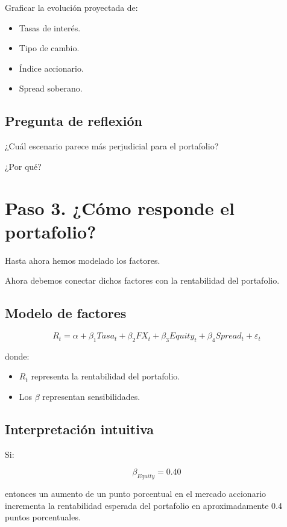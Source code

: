 \documentclass[11pt]{article}
\begin{document}
Graficar la evolución proyectada de:

\begin{itemize}
\item Tasas de interés.
\item Tipo de cambio.
\item Índice accionario.
\item Spread soberano.
\end{itemize}

\subsection*{Pregunta de reflexión}

¿Cuál escenario parece más perjudicial para el portafolio?

¿Por qué?

\section{Paso 3. ¿Cómo responde el portafolio?}

Hasta ahora hemos modelado los factores.

Ahora debemos conectar dichos factores con la rentabilidad del portafolio.

\subsection*{Modelo de factores}

\[
R_t =
\alpha
+
\beta_1 Tasa_t
+
\beta_2 FX_t
+
\beta_3 Equity_t
+
\beta_4 Spread_t
+
\varepsilon_t
\]

donde:

\begin{itemize}
\item $R_t$ representa la rentabilidad del portafolio.
\item Los $\beta$ representan sensibilidades.
\end{itemize}

\subsection*{Interpretación intuitiva}

Si:

\[
\beta_{Equity}=0.40
\]

entonces un aumento de un punto porcentual en el mercado accionario incrementa la rentabilidad esperada del portafolio en aproximadamente 0.4 puntos porcentuales.
\end{document}
